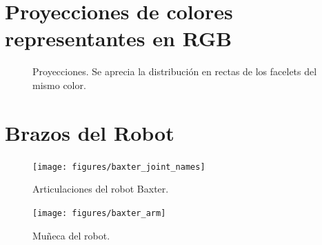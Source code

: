 {\newpage
\small{\section*{Proyecciones de colores representantes en RGB}}
\begin{figure}[h!]
	\centering
	\vfill
	\vfill
	\caption[Proyecciones.]{Proyecciones. Se aprecia la distribución en rectas de los facelets del mismo color.}
	\label{proyecciones}
\end{figure}

}
\newpage
\section*{Brazos del Robot}
\begin{figure}[h!]
	\centering
	\texttt{[image: figures/baxter\_joint\_names]}
	\caption{Articulaciones del robot Baxter.}
	\label{baxterjoints}
\end{figure}
\begin{figure}[h!]
	\centering
	\texttt{[image: figures/baxter\_arm]}
	\caption{Muñeca del robot.}
	\label{baxterjoints}
\end{figure}

